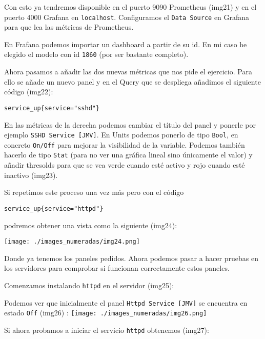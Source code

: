 Con esto ya tendremos disponible en el puerto 9090 Prometheus (img21) y
en el puerto 4000 Grafana en \texttt{localhost}. Configuramos el
\texttt{Data\ Source} en Grafana para que lea las métricas de
Prometheus.

En Frafana podemos importar un dashboard a partir de su id. En mi caso
he elegido el modelo con id \texttt{1860} (por ser bastante completo).

Ahora pasamos a añadir las dos nuevas métricas que nos pide el
ejercicio. Para ello se añade un nuevo panel y en el Query que se
despliega añadimos el siguiente código (img22):

\begin{verbatim}
service_up{service="sshd"}
\end{verbatim}

En las métricas de la derecha podemos cambiar el título del panel y
ponerle por ejemplo \texttt{SSHD\ Service\ {[}JMV{]}}. En Units podemos
ponerlo de tipo \texttt{Bool}, en concreto \texttt{On/Off} para mejorar
la visibilidad de la variable. Podemos también hacerlo de tipo
\texttt{Stat} (para no ver una gráfica lineal sino únicamente el valor)
y añadir thresolds para que se vea verde cuando esté activo y rojo
cuando esté inactivo (img23).

Si repetimos este proceso una vez más pero con el código

\begin{verbatim}
service_up{service="httpd"}
\end{verbatim}

podremos obtener una vista como la siguiente (img24):

\texttt{[image: ./images\_numeradas/img24.png]}

Donde ya tenemos los paneles pedidos. Ahora podemos pasar a hacer
pruebas en los servidores para comprobar si funcionan correctamente
estos paneles.

Comenzamos instalando \texttt{httpd} en el servidor (img25):

\begin{Shaded}
\begin{Highlighting}[]
\end{Highlighting}
\end{Shaded}

Podemos ver que inicialmente el panel \texttt{Httpd\ Service\ {[}JMV{]}}
se encuentra en estado \texttt{Off} (img26) :
\texttt{[image: ./images\_numeradas/img26.png]}

Si ahora probamos a iniciar el servicio \texttt{httpd} obtenemos
(img27):

